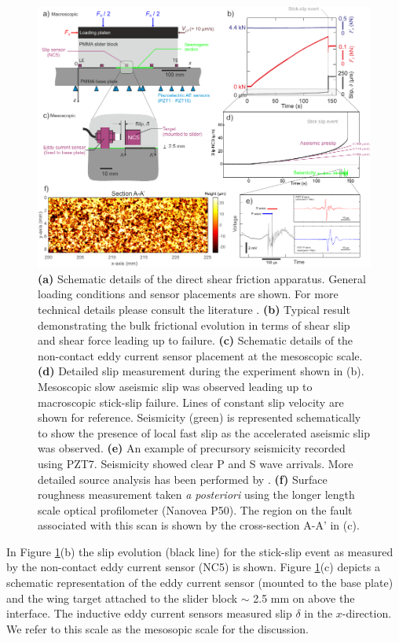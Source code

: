 \documentclass[preprint,1p, 10pt,authoryear]{elsarticle}
\begin{document}
\begin{figure}
 	\centering
 	\includegraphics{FIG1_revised.pdf} 
 	\caption{ \textbf{(a)} Schematic details of the direct shear friction apparatus. General loading conditions and sensor placements are shown. For more technical details please consult the literature \citep{Selvadurai2015, Selvadurai2015a}. \textbf{(b)} Typical result demonstrating the bulk frictional evolution in terms of shear slip and shear force leading up to failure. \textbf{(c)} Schematic details of the non-contact eddy current sensor placement at the mesoscopic scale. \textbf{(d)} Detailed slip measurement during the experiment shown in (b).  Mesoscopic slow aseismic slip was observed leading up to macroscopic stick-slip failure.  Lines of constant slip velocity are shown for reference.  Seismicity (green) is represented schematically to show the presence of local fast slip as the accelerated aseismic slip was observed. \textbf{(e)}  An example of precursory seismicity recorded using PZT7.  Seismicity showed clear P and S wave arrivals. More detailed source analysis has been performed by \citet{Selvadurai2019}. \textbf{(f)} Surface roughness measurement taken \textit{a posteriori} using the longer length scale optical profilometer (Nanovea P50).  The region on the fault associated with this scan is shown by the cross-section A-A’ in (c).}
 	\label{fig1}
 \end{figure}
 In Figure \ref{fig1}(b) the slip evolution (black line) for the stick-slip event as measured by the non-contact eddy current sensor (NC5) is shown.  Figure \ref{fig1}(c) depicts a schematic representation of the eddy current sensor (mounted to the base plate) and the wing target attached to the slider block $\sim$ 2.5 mm on above the interface.  The inductive eddy current sensors measured slip $\delta$ in the $x$-direction. We refer to this scale as the mesosopic scale for the discussion.
 
\end{document}

